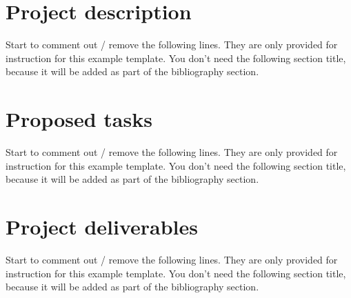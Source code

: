 \documentclass[11pt,fleqn,twoside]{article}
\begin{document}
\wordcount{}

\mmp
\tableofcontents
\newpage
\setcounter{tocdepth}{3} %


\section{Project description}
Start to comment out / remove the following lines. They are only provided for instruction for this example template.  You don't need the following section title, because it will be added as part of the bibliography section. 

\section{Proposed tasks}
Start to comment out / remove the following lines. They are only provided for instruction for this example template.  You don't need the following section title, because it will be added as part of the bibliography section. 
\section{Project deliverables}
Start to comment out / remove the following lines. They are only provided for instruction for this example template.  You don't need the following section title, because it will be added as part of the bibliography section. 
\end{document}

